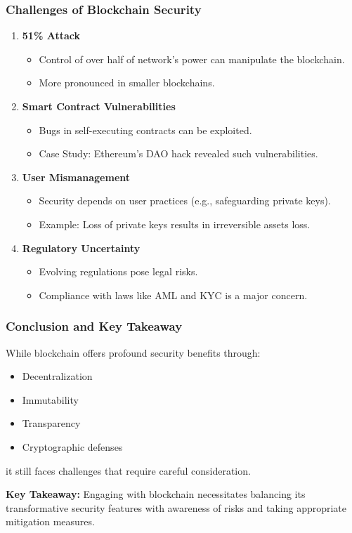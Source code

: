 \documentclass{beamer}
\begin{document}
\begin{frame}[fragile]
    \frametitle{Challenges of Blockchain Security}
    \begin{enumerate}
        \item \textbf{51\% Attack}
            \begin{itemize}
                \item Control of over half of network's power can manipulate the blockchain.
                \item More pronounced in smaller blockchains.
            \end{itemize}

        \item \textbf{Smart Contract Vulnerabilities}
            \begin{itemize}
                \item Bugs in self-executing contracts can be exploited.
                \item Case Study: Ethereum's DAO hack revealed such vulnerabilities.
            \end{itemize}

        \item \textbf{User Mismanagement}
            \begin{itemize}
                \item Security depends on user practices (e.g., safeguarding private keys).
                \item Example: Loss of private keys results in irreversible assets loss.
            \end{itemize}

        \item \textbf{Regulatory Uncertainty}
            \begin{itemize}
                \item Evolving regulations pose legal risks.
                \item Compliance with laws like AML and KYC is a major concern.
            \end{itemize}
    \end{enumerate}
\end{frame}

\begin{frame}[fragile]
    \frametitle{Conclusion and Key Takeaway}
    While blockchain offers profound security benefits through:
    \begin{itemize}
        \item Decentralization
        \item Immutability
        \item Transparency
        \item Cryptographic defenses
    \end{itemize}
    it still faces challenges that require careful consideration.
    
    \textbf{Key Takeaway:} Engaging with blockchain necessitates balancing its transformative security features with awareness of risks and taking appropriate mitigation measures.
\end{frame}
\end{document}
